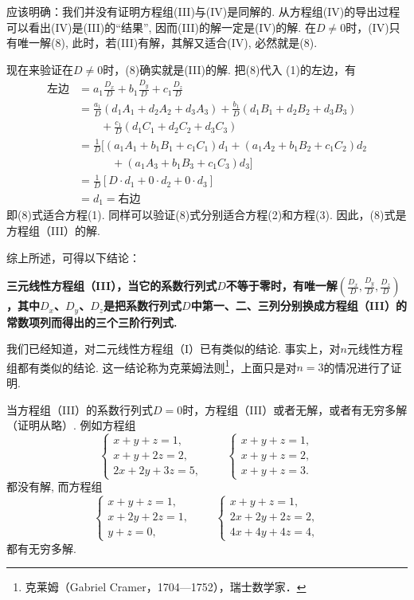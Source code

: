 应该明确：我们并没有证明方程组(III)与(IV)是同解的. 从方程组(IV)的导出过程可以看出(IV)是(III)的“结果”, 因而(III)的解一定是(IV)的解. 在$D\neq0$时，(IV)只有唯一解(8), 此时，若(III)有解，其解又适合(IV), 必然就是(8).

现在来验证在$D\neq0$时，(8)确实就是(III)的解. 把(8)代入
(1)的左边，有
\[\begin{split}
  \text{左边}&=a_1\frac {D_x}D+ b_1\frac {D_y}D+ c_1\frac {D_z}D\\
&=\frac{a_{1}}{D}(d_{1}A_{1}+d_{2}A_{2}+d_{3}A_{3})+\frac{b_{1}}{D}(d_{1}B_{1}+d_{2}B_{2}+d_{3}B_{3})\\
&\qquad +\frac{c_1}D(d_1C_1+d_2C_2+d_3C_3)\\
&=\frac{1}{D}[(a_{1}A_{1}+b_{1}B_{1}+c_{1}C_{1})d_{1}+(a_{1}A_{2}+b_{1}B_{2}+c_{1}C_{2})d_{2}\\
&\qquad \quad+(a_{1}A_{3}+b_{1}B_{3}+c_{1}C_{3})d_{3}]\\
&=\frac{1}{D}[D\cdot d_{1}+0\cdot d_{2}+0\cdot d_{3}]\\
&=d_1=\text{右边}
\end{split}\]
即(8)式适合方程(1). 同样可以验证(8)式分别适合方程(2)和方程(3). 因此，(8)式是方程组（III）的解.

综上所述，可得以下结论：

\textbf{三元线性方程组（III），当它的系数行列式$D$不等于零时，有唯一解$\left(\frac{D_x}{D},\frac{D_y}{D},\frac{D_z}{D}\right)$，其中$D_x$、$D_y$、$D_z$是把系数行列式$D$中第一、二、三列分别换成方程组（III）的常数项列而得出的三个三阶行列式.}

我们已经知道，对二元线性方程组（I）已有类似的结论. 事实上，对$n$元线性方程组都有类似的结论. 这一结论称为克莱姆法则\footnote{克莱姆（Gabriel Cramer，1704—1752），瑞士数学家．}，上面只是对$n=3$的情况进行了证明.

当方程组（III）的系数行列式$D=0$时，方程组（III）或者无解，或者有无穷多解（证明从略）. 例如方程组
\[\begin{cases}x+y+z=1,\\x+y+2z=2,\\2x+2y+3z=5,\end{cases}\qquad \begin{cases}x+y+z=1,\\x+y+z=2,\\x+y+z=3.\end{cases}\]
都没有解, 而方程组
\[\begin{cases}x+y+z=1,\\x+2y+2z=1,\\y+z=0,\end{cases}\qquad \begin{cases}x+y+z=1,\\2x+2y+2z=2,\\4x+4y+4z=4,\end{cases}\]
都有无穷多解.

